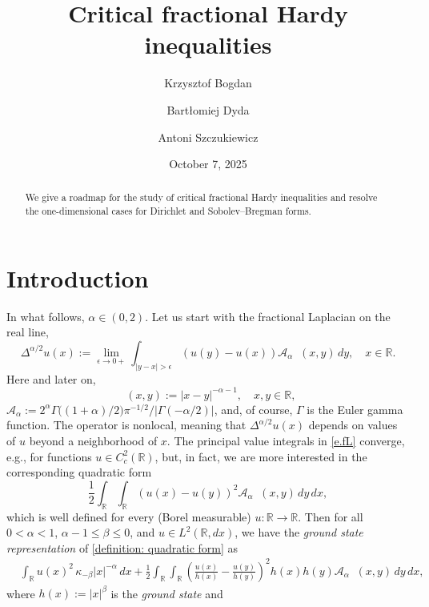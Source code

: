 \documentclass[12pt, a4paper]{amsart}
\title{Critical fractional Hardy inequalities}
\author[K.~Bogdan]{Krzysztof Bogdan}
\author[B.~Dyda]{Bart\l{}omiej Dyda}
\author[A.~Szczukiewicz]{Antoni Szczukiewicz}
\date{October 7, 2025}
\DeclareMathOperator{\Mass}{\nu_{\alpha}}
\newcommand{\R}{\mathbb{R}}
\begin{document}
\maketitle

\begin{abstract}
   We give a roadmap for the study of critical fractional Hardy inequalities and resolve the one-dimensional cases for Dirichlet and Sobolev–Bregman forms.
\end{abstract}
\section{Introduction}

In what follows, $\alpha \in (0, 2)$. Let us start  with the fractional Laplacian on the real line,
\begin{equation}
    \label{e.fL}
\Delta^{\alpha/2}u(x) := \underset{\epsilon \to 0+}{\lim} \int_{|y-x|>\epsilon} \left(u(y)-u(x)\right) \mathcal {A}_{\alpha}\Mass(x,y) \,dy,\quad x\in \mathbb R.
\end{equation}
Here and later on,
    \begin{equation}
        \label{e.na}
        \Mass(x, y) := |x - y|^{-\alpha - 1},\quad x,y\in \R,    \end{equation}
    $\mathcal {A}_{\alpha}:=
2^{\alpha}\Gamma\big((1+\alpha)/2\big)\pi^{-1/2}/|\Gamma(-\alpha/2)|$, and, of course, $\Gamma$ is the Euler gamma function. The operator is nonlocal, meaning that $\Delta^{\alpha/2}u(x)$ depends on values of $u$ beyond a neighborhood of $x$. The principal value integrals in \eqref{e.fL} converge, e.g., for functions $u\in C_c^{2}(\mathbb R)$, but, 
in fact, we are more interested in the corresponding quadratic form
\begin{equation}\label{definition: quadratic form}
\frac{1}{2} \int_{\R} \int_{\R} (u(x)-u(y))^2 \mathcal {A}_{\alpha}\Mass(x,y) \,dy \,dx,
\end{equation}
which is well defined for every (Borel measurable) $u: \R \to \R$.
Then for all $0<\alpha<1$, $\alpha-1 \leq \beta \leq 0$,
and
$u \in L^2(\R, dx)$, we have the \textit{ground state representation} of \eqref{definition: quadratic form} as
\begin{align}\label{e:p2}
&
\int_{\R} u(x)^2\,\kappa_{-\beta}|x|^{-\alpha}\,dx
 + \frac{1}{2} \int_{\R}\!\int_{\R}
\left(\frac{u(x)}{h(x)}-\frac{u(y)}{h(y)}\right)^2
h(x)h(y) {\mathcal{A}}_{\alpha}\Mass(x,y)
\,dy\,dx,
\end{align}
where $h(x):=|x|^{\beta}$ is the \textit{ground state} and
\end{document}
